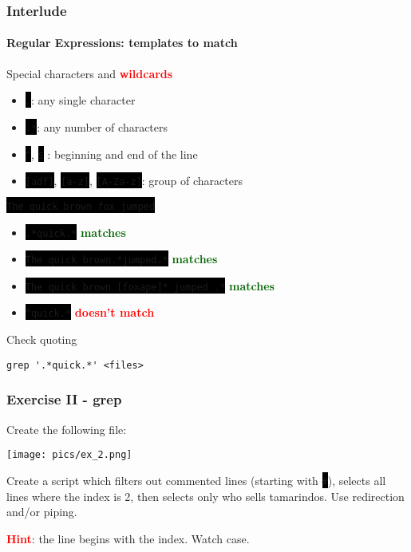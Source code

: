 \documentclass[unknownkeysallowed, 10pt, a4 paper, handout]{beamer}
\newcommand{\green}[1]{\textbf{\textcolor{darkgreen}{#1}}}
\newcommand{\red}[1]{\textbf{\textcolor{red}{#1}}}
\newcommand{\focus}[1]{\textbf{\textcolor{red}{#1}}}
\newcommand{\code}[1]{\colorbox{black}{\color{green}\texttt{#1}}}
\newcommand{\sidebyside}[5]{
  \begin{minipage}{#1\textwidth}
    #2
  \end{minipage} #3 \begin{minipage}{#4\textwidth}
    #5
  \end{minipage}
}
\begin{document}
\begin{frame}[fragile=singleslide]
  \frametitle{Interlude}
  \framesubtitle{Regular Expressions: templates to match}

  \footnotesize{
    \begin{exampleblock}{}
    Special characters and \focus{wildcards}
    \begin{itemize}
      \item \code{.}: any single character
      \item \code{.*}: any number of characters
      \item \code{\^}, \code{\$} : beginning and end of the line
      \item \code{[adf]}, \code{[a-z]}, \code{[A-Za-z]}: group of characters
    \end{itemize}
  \end{exampleblock}

    \begin{exampleblock}{}
    \code{The quick brown fox jumped}
    \begin{itemize}
      \item \code{.*quick.*} \green{matches}
      \item \code{The quick brown.*jumped.*} \green{matches}
      \item \code{The quick brown [foxape]* jumped .*} \green{matches}
      \item \code{\^{}quick.*} \red{doesn't match}
    \end{itemize}
  \end{exampleblock}

  \begin{alertblock}{Check quoting}
    \begin{verbatim}
grep '.*quick.*' <files>
    \end{verbatim}
  \end{alertblock}
  }
\end{frame}

\begin{frame}
  \begin{center}
    \frametitle{Exercise II - grep}

    \sidebyside{0.35}{
      Create the following file:
    }{\hfill}{0.60}{
      \begin{center}
        \texttt{[image: pics/ex\_2.png]}
      \end{center}
    }

    \vspace{6mm}

    Create a script which filters out commented lines (starting with
    \code{\#}), selects all lines where the index is 2, then selects only who
    sells tamarindos. Use redirection and/or piping.

    \vspace{6mm}

    \focus{Hint}: the line begins with the index. Watch case.
  \end{center}
\end{frame}
\end{document}

